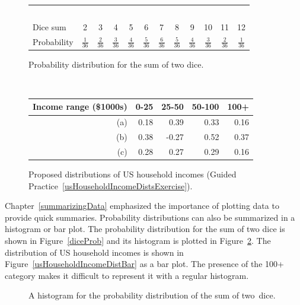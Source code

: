 \begin{figure}[hhh]
\centering
\begin{tabular}{l ccc ccc ccc cc}
  \hline
  \ \vspace{-3mm} \\
Dice sum\vspace{0.3mm} & 2 & 3 & 4 & 5 & 6 & 7 & 8 & 9 & 10 & 11 & 12  \\
Probability & $\frac{1}{36}$ & $\frac{2}{36}$ & $\frac{3}{36}$ & $\frac{4}{36}$ & $\frac{5}{36}$ & $\frac{6}{36}$ & $\frac{5}{36}$ & $\frac{4}{36}$ & $\frac{3}{36}$ & $\frac{2}{36}$ & $\frac{1}{36}$\vspace{1mm} \\
   \hline
\end{tabular}
\caption{Probability distribution for the sum of two dice.}
\label{diceProb}
\ \\[5mm]
\begin{tabular}{r | rr rr}
  \hline
Income range (\$1000s) & 0-25    & 25-50    & 50-100     & 100+    \\
  \hline
(a)\hspace{0.2mm}	 & 0.18 & 0.39 & 0.33 & 0.16 \\
(b)				 & 0.38 & -0.27 & 0.52 & 0.37 \\
(c)\hspace{0.2mm}	 & 0.28 & 0.27 & 0.29 & 0.16 \\
  \hline
\end{tabular}
\caption{Proposed distributions of US household incomes (Guided Practice~\ref{usHouseholdIncomeDistsExercise}).}
\label{usHouseholdIncomeDists}
\end{figure}


Chapter~\ref{summarizingData} emphasized the importance of plotting data to provide quick summaries. Probability distributions can also be summarized in a histogram or bar plot. The probability distribution for the sum of two dice is shown in Figure~\ref{diceProb} and its histogram is plotted in Figure~\ref{diceSumDist}. The distribution of US household incomes is shown in Figure~\ref{usHouseholdIncomeDistBar} as a bar plot. The presence of the 100+ category makes it difficult to represent it with a regular histogram.

\begin{figure}[h]
\centering
\caption{A histogram for the probability distribution of the sum of two~dice.}
\label{diceSumDist}
\end{figure}

